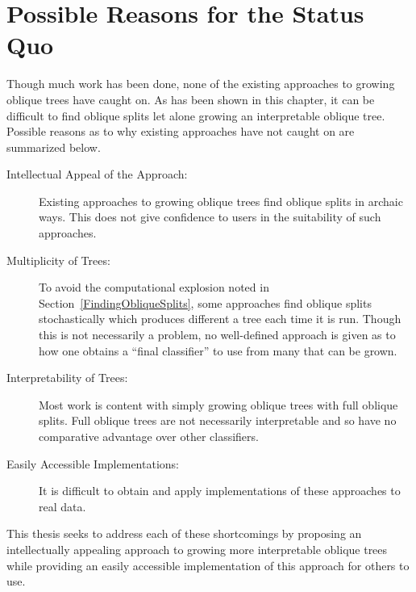 \section{Possible Reasons for the Status Quo}
\label{PossibleReasonsfortheStatusQuo}
Though much work has been done, none of the existing approaches to growing oblique trees have caught on. As has been shown in this chapter, it can be difficult to find oblique splits let alone growing an interpretable oblique tree. Possible reasons as to why existing approaches have not caught on are summarized below.
\begin{description}
\item[Intellectual Appeal of the Approach:] Existing approaches to growing oblique trees find oblique splits in archaic ways. This does not give confidence to users in the suitability of such approaches. 
\item[Multiplicity of Trees:] To avoid the computational explosion noted in Section~\ref{FindingObliqueSplits}, some approaches find oblique splits stochastically which produces different a tree each time it is run. Though this is not necessarily a problem, no well-defined approach is given as to how one obtains a ``final classifier'' to use from many that can be grown. 
\item[Interpretability of Trees:] Most work is content with simply growing oblique trees with full oblique splits. Full oblique trees are not necessarily interpretable and so have no comparative advantage over other classifiers.
\item[Easily Accessible Implementations:] It is difficult to obtain and apply implementations of these approaches to real data.
\end{description}
This thesis seeks to address each of these shortcomings by proposing an intellectually appealing approach to growing more interpretable oblique trees while providing an easily accessible implementation of this approach for others to use.